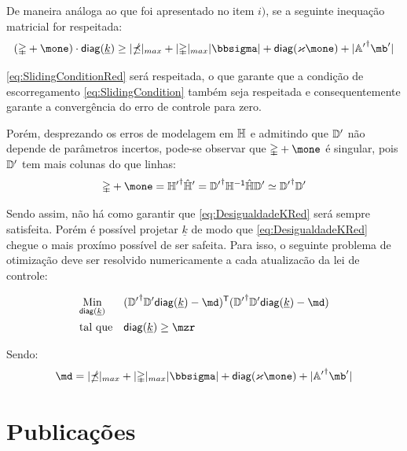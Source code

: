 \documentclass[a4paper,11pt,brazil,fleqn]{article}
\begin{document}
\begin{itemize}
De maneira an\'aloga ao que foi apresentado no item $i)$, se a seguinte inequa\c{c}\~ao matricial for respeitada:
\begin{equation} \label{eq:DesigualdadeKRed}
(\mDelta + \mone) \cdot \diag(\underline{k})  \geq |\mdelta|_{max} + |\mDelta|_{max} |\msigma| + \diag(\varkappa \mone) + |{\mA'}^\msP \mb'|
\end{equation}

\eqref{eq:SlidingConditionRed} ser\'a respeitada, o que garante que a condi\c{c}\~ao de escorregamento \eqref{eq:SlidingCondition} tamb\'em seja respeitada e consequentemente garante a converg\^encia do erro de controle para zero.

Por\'em, desprezando os erros de modelagem em $\mathbb{H}$ e admitindo que $\mathbb{D}'$ n\~ao depende de par\^ametros incertos, pode-se observar que $\mDelta + \mone$ \'e singular, pois $\mathbb{D}'$ tem mais colunas do que linhas:
\begin{equation}
\mDelta + \mone = {\mH'}^\msP \hat{\mH}' = {\mD'}^\msP {\mH}^\msI \hat{\mH} \mD' \simeq {\mD'}^\msP \mD'
\end{equation}

Sendo assim, n\~ao h\'a como garantir que \eqref{eq:DesigualdadeKRed} ser\'a sempre satisfeita. Por\'em \'e poss\'ivel projetar $\underline{k}$ de modo que \eqref{eq:DesigualdadeKRed} chegue o mais prox\'imo poss\'ivel de ser safeita. Para isso, o seguinte problema de otimiza\c{c}\~ao deve ser resolvido numericamente a cada atualiza{c}\~ao da lei de controle:

\begin{equation} \label{eq:OptimizationRed}
\begin{aligned}
& \underset{\diag(\underline{k})}{\text{Min}}
& & ({\mD'}^\msP \mD' \diag(\underline{k}) - \md )^\msT  ({\mD'}^\msP \mD' \diag(\underline{k}) - \md) \\
& \text{tal que}
& & \diag(\underline{k}) \geq \mzr
\end{aligned}
\end{equation}

Sendo:
\begin{equation}
\md = |\mdelta|_{max} + |\mDelta|_{max} |\msigma| + \diag(\varkappa \mone) + |{\mA'}^\msP \mb'|
\end{equation}

\end{itemize}


\section{Publica\c{c}\~oes}\label{S05}
\end{document}
